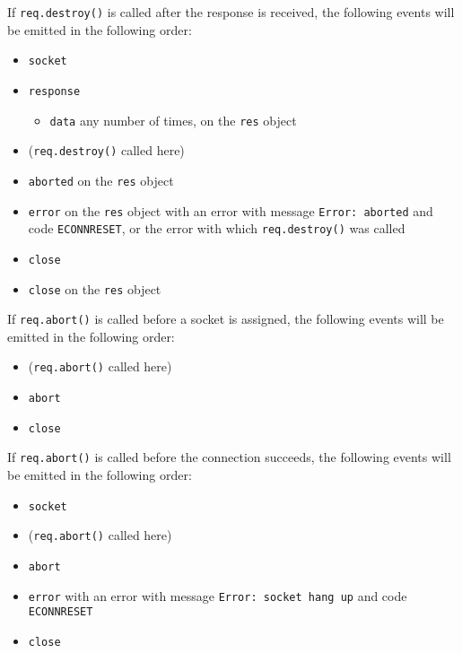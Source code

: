 If \texttt{req.destroy()} is called after the response is received, the
following events will be emitted in the following order:

\begin{itemize}
\tightlist
\item
  \texttt{\textquotesingle{}socket\textquotesingle{}}
\item
  \texttt{\textquotesingle{}response\textquotesingle{}}

  \begin{itemize}
  \tightlist
  \item
    \texttt{\textquotesingle{}data\textquotesingle{}} any number of
    times, on the \texttt{res} object
  \end{itemize}
\item
  (\texttt{req.destroy()} called here)
\item
  \texttt{\textquotesingle{}aborted\textquotesingle{}} on the
  \texttt{res} object
\item
  \texttt{\textquotesingle{}error\textquotesingle{}} on the \texttt{res}
  object with an error with message
  \texttt{\textquotesingle{}Error:\ aborted\textquotesingle{}} and code
  \texttt{\textquotesingle{}ECONNRESET\textquotesingle{}}, or the error
  with which \texttt{req.destroy()} was called
\item
  \texttt{\textquotesingle{}close\textquotesingle{}}
\item
  \texttt{\textquotesingle{}close\textquotesingle{}} on the \texttt{res}
  object
\end{itemize}

If \texttt{req.abort()} is called before a socket is assigned, the
following events will be emitted in the following order:

\begin{itemize}
\tightlist
\item
  (\texttt{req.abort()} called here)
\item
  \texttt{\textquotesingle{}abort\textquotesingle{}}
\item
  \texttt{\textquotesingle{}close\textquotesingle{}}
\end{itemize}

If \texttt{req.abort()} is called before the connection succeeds, the
following events will be emitted in the following order:

\begin{itemize}
\tightlist
\item
  \texttt{\textquotesingle{}socket\textquotesingle{}}
\item
  (\texttt{req.abort()} called here)
\item
  \texttt{\textquotesingle{}abort\textquotesingle{}}
\item
  \texttt{\textquotesingle{}error\textquotesingle{}} with an error with
  message
  \texttt{\textquotesingle{}Error:\ socket\ hang\ up\textquotesingle{}}
  and code \texttt{\textquotesingle{}ECONNRESET\textquotesingle{}}
\item
  \texttt{\textquotesingle{}close\textquotesingle{}}
\end{itemize}

